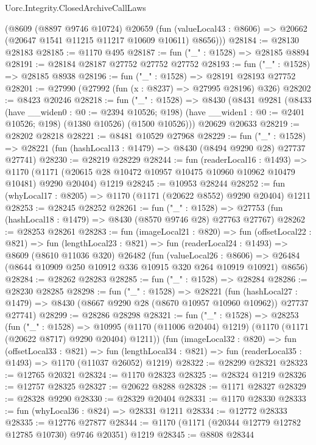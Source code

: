 \begin{lexlean}{Uorc.Integrity.ClosedArchiveCallLaws}
\begin{coremodule}
      (@8609
        (@8897 @9746 @10724)
        @20659
        (fun (valueLocal43 : @8606) => @20662 (@20647 @1541 @11215 @11217 @10609 @10611) @8656)))
@28184 := @28130 @28183
@28185 := @1170 @495
@28187 := fun ("_" : @1528) => @28185 @8894
@28191 := @28184 @28187 @27752 @27752 @27752
@28193 := fun ("_" : @1528) => @28185 @8938
@28196 := fun ("_" : @1528) => @28191 @28193 @27752
@28201 := @27990 (@27992 (fun (x : @8237) => @27995 @28196) @326)
@28202 := @8423 @20246
@28218 := fun ("_" : @1528) =>
  @8430
    (@8431
      @9281
      (@8433
        (have __widen0 : @0 := @2394 @10526; @198)
        (have __widen1 : @0 := @2401 @10526; @198)
        (@1380 @10526)
        (@1500 @10526)))
    @20629
    @20633
@28219 := @28202 @28218
@28221 := @8481 @10529 @27968
@28229 := fun ("_" : @1528) =>
  @28221 (fun (hashLocal13 : @1479) => @8430 (@8494 @9290 @28) @27737 @27741)
@28230 := @28219 @28229
@28244 := fun (readerLocal16 : @1493) =>
  @1170 (@1171 (@20615 @28 @10472 @10957 @10475 @10960 @10962 @10479 @10481) @9290 @20404) @1219
@28245 := @10953 @28244
@28252 := fun (whyLocal17 : @8205) => @1170 (@1171 (@20622 @8552) @9290 @20404) @1211
@28253 := @28245 @28252
@28261 := fun ("_" : @1528) =>
  @27753 (fun (hashLocal18 : @1479) => @8430 (@8570 @9746 @28) @27763 @27767)
@28262 := @28253 @28261
@28283 := fun (imageLocal21 : @820) =>
  fun (offsetLocal22 : @821) =>
  fun (lengthLocal23 : @821) =>
  fun (readerLocal24 : @1493) =>
  @8609
    (@8610 @11036 @320)
    @26482
    (fun (valueLocal26 : @8606) =>
    @26484 (@8644 @10909 @250 @10912 @336 @10915 @320 @264 @10919 @10921) @8656)
@28284 := @28262 @28283
@28285 := fun ("_" : @1528) => @28284
@28286 := @28230 @28285
@28298 := fun ("_" : @1528) =>
  @28221
    (fun (hashLocal27 : @1479) =>
    @8430 (@8667 @9290 @28 (@8670 @10957 @10960 @10962)) @27737 @27741)
@28299 := @28286 @28298
@28321 := fun ("_" : @1528) =>
  @28253
    (fun ("_" : @1528) =>
    @10995 (@1170 (@11006 @20404) @1219) (@1170 (@1171 (@20622 @8717) @9290 @20404) @1211))
    (fun (imageLocal32 : @820) =>
    fun (offsetLocal33 : @821) =>
    fun (lengthLocal34 : @821) => fun (readerLocal35 : @1493) => @1170 (@11037 @26052) @1219)
@28322 := @28299 @28321
@28323 := @12765 @20321
@28324 := @1170 @28323
@28325 := @28324 @1219
@28326 := @12757 @28325
@28327 := @20622 @8288
@28328 := @1171 @28327
@28329 := @28328 @9290
@28330 := @28329 @20404
@28331 := @1170 @28330
@28333 := fun (whyLocal36 : @824) => @28331 @1211
@28334 := @12772 @28333
@28335 := @12776 @27877
@28344 := @1170 (@1171 (@20344 @12779 @12782 @12785 @10730) @9746 @20351) @1219
@28345 := @8808 @28344

\end{coremodule}
\end{lexlean}
